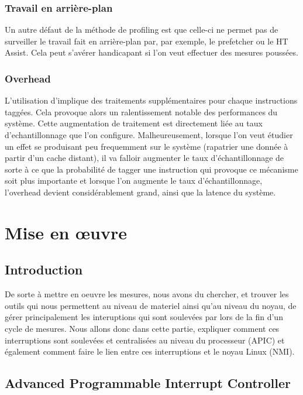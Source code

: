 					\subsubsection{Travail en arrière-plan}
						Un autre défaut de la méthode de profiling \IBS est que celle-ci ne permet pas de surveiller le travail fait en arrière-plan par, par exemple, le prefetcher ou le HT Assist. Cela peut s'avérer handicapant si l'on veut effectuer des mesures poussées.
					\subsubsection{Overhead}
						L'utilisation d'\IBS implique des traitements supplémentaires pour chaque instructions taggées. Cela provoque alors un ralentissement notable des performances du système. Cette augmentation de traitement est directement liée au taux d'echantillonnage que l'on configure. Malheureusement, lorsque l'on veut étudier un effet se produisant peu frequemment sur le système (rapatrier une donnée à partir d'un cache distant), il va falloir augmenter le taux d'échantillonnage de sorte à ce que la probabilité de tagger une instruction qui provoque ce mécanisme soit plus importante et lorsque l'on augmente le taux d'échantillonnage, l'overhead devient considérablement grand, ainsi que la latence du système.
			\section{Mise en \oe uvre}
				\subsection{Introduction}
					De sorte à mettre en oeuvre les mesures, nous avons du chercher, et trouver les outils qui nous permettent au niveau de materiel ainsi qu'au niveau du noyau, de gérer principalement les interuptions qui sont soulevées par \IBS lors de la fin d'un cycle de mesures. Nous allons donc dans cette partie, expliquer comment ces interruptions sont soulevées et centralisées au niveau du processeur (APIC) et également comment faire le lien entre ces interruptions et le noyau Linux (NMI).
				\subsection{Advanced Programmable Interrupt Controller}
